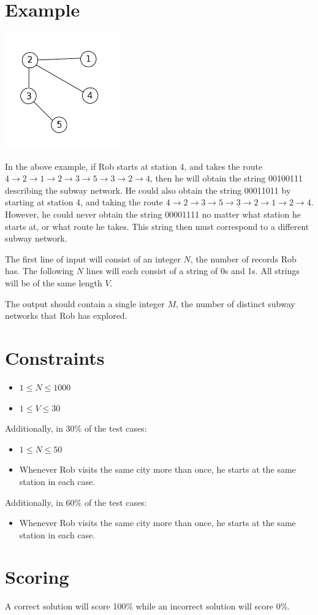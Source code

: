 \documentclass{saco}
\begin{document}
\section{Example}
\includegraphics[height=5cm]{image/example.png}

In the above example, if Rob starts at station 4, and takes the route $4\rightarrow2\rightarrow1\rightarrow2\rightarrow3\rightarrow5\rightarrow3\rightarrow2\rightarrow4$, then he will obtain the string 00100111 describing the subway network.
He could also obtain the string 00011011 by starting at station 4, and taking the route $4\rightarrow2\rightarrow3\rightarrow5\rightarrow3\rightarrow2\rightarrow1\rightarrow2\rightarrow4$.
However, he could never obtain the string 00001111 no matter what station he starts at, or what route he takes.
This string then must correspond to a different subway network.

The first line of input will consist of an integer $N$, the number of records Rob has.
The following $N$ lines will each consist of a string of 0s and 1s. All strings will be of the same length $V$.
\sampleinput

\outputformat
The output should contain a single integer $M$, the number of distinct subway networks that Rob has explored.
\sampleoutput

\section{Constraints}
\begin{itemize}
\item $1 \leq N \leq 1000$
\item $1 \leq V \leq 30$
\end{itemize}

Additionally, in 30\% of the test cases:
\begin{itemize}
\item $1 \leq N \leq 50$
\item Whenever Rob visits the same city more than once, he starts at the same station in each case.
\end{itemize}

Additionally, in 60\% of the test cases:
\begin{itemize}
\item Whenever Rob visits the same city more than once, he starts at the same station in each case.
\end{itemize}

\timelimit

\feedback

\section{Scoring}
A correct solution will score 100\% while an incorrect solution will score 0\%.
\end{document}
